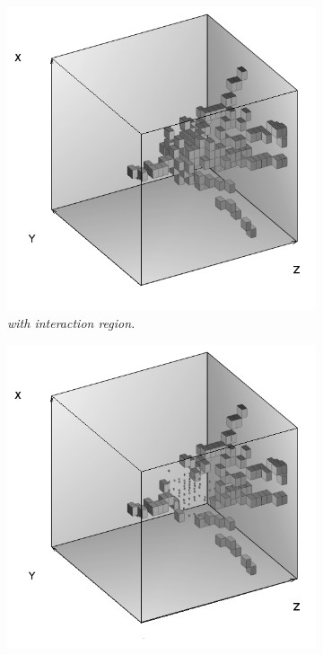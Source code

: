 \begin{figure}
	\centering
	\begin{subfigure}{0.5\textwidth}
		\centering
		\includegraphics[width=.90\linewidth]{ECAL/graphics/before.png}
		\caption{\label{fig:before} \sl with interaction region.}
	\end{subfigure}%
	\begin{subfigure}{0.5\textwidth}
		\centering
		\includegraphics[width=.90\linewidth]{ECAL/graphics/after2.png}

\end{subfigure}
\end{figure}
